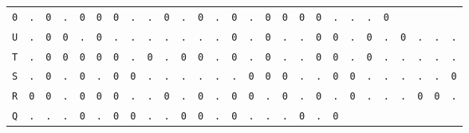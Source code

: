 \begin{figure}[H]
\begin{center}
{\begin{tabular}{c|cccccccccccccccccccccccccc}
        \texttt{0} & \texttt{.} & \texttt{0} & \texttt{.} &
        \texttt{0} & \texttt{0} & \texttt{0} & \texttt{.} &
        \texttt{.} & \texttt{0} & \texttt{.} & \texttt{0} &
        \texttt{.} & \texttt{0} & \texttt{.} & \texttt{0} &
        \texttt{0} & \texttt{0} & \texttt{0} & \texttt{.} &
        \texttt{.} & \texttt{.} & \texttt{0}                             \\
        \texttt{U} & \texttt{.} & \texttt{0} & \texttt{0} &
        \texttt{.} & \texttt{0} & \texttt{.} & \texttt{.} &
        \texttt{.} & \texttt{.} & \texttt{.} & \texttt{.} &
        \texttt{.} & \texttt{0} & \texttt{.} & \texttt{0} &
        \texttt{.} & \texttt{.} & \texttt{0} & \texttt{0} &
        \texttt{.} & \texttt{0} & \texttt{.} & \texttt{0} &
        \texttt{.} & \texttt{.} & \texttt{.}                             \\
        \texttt{T} & \texttt{.} & \texttt{0} & \texttt{0} &
        \texttt{0} & \texttt{0} & \texttt{0} & \texttt{.} &
        \texttt{0} & \texttt{.} & \texttt{0} & \texttt{0} &
        \texttt{.} & \texttt{0} & \texttt{.} & \texttt{0} &
        \texttt{.} & \texttt{.} & \texttt{0} & \texttt{0} &
        \texttt{.} & \texttt{0} & \texttt{.} & \texttt{.} &
        \texttt{.} & \texttt{.} & \texttt{.}                             \\
        \texttt{S} & \texttt{.} & \texttt{0} & \texttt{.} &
        \texttt{0} & \texttt{.} & \texttt{0} & \texttt{0} &
        \texttt{.} & \texttt{.} & \texttt{.} & \texttt{.} &
        \texttt{.} & \texttt{.} & \texttt{0} & \texttt{0} &
        \texttt{0} & \texttt{.} & \texttt{.} & \texttt{0} &
        \texttt{0} & \texttt{.} & \texttt{.} & \texttt{.} &
        \texttt{.} & \texttt{.} & \texttt{0}                             \\
        \texttt{R} & \texttt{0} & \texttt{0} & \texttt{.} &
        \texttt{0} & \texttt{0} & \texttt{0} & \texttt{.} &
        \texttt{.} & \texttt{0} & \texttt{.} & \texttt{0} &
        \texttt{.} & \texttt{0} & \texttt{0} & \texttt{.} &
        \texttt{0} & \texttt{.} & \texttt{0} & \texttt{.} &
        \texttt{0} & \texttt{.} & \texttt{.} & \texttt{.} &
        \texttt{0} & \texttt{0} & \texttt{.}                             \\
        \texttt{Q} & \texttt{.} & \texttt{.} & \texttt{.} &
        \texttt{0} & \texttt{.} & \texttt{0} & \texttt{0} &
        \texttt{.} & \texttt{.} & \texttt{0} & \texttt{0} &
        \texttt{.} & \texttt{0} & \texttt{.} & \texttt{.} &
        \texttt{.} & \texttt{0} & \texttt{.} & \texttt{0} &

\end{tabular}}
\end{center}
\end{figure}
